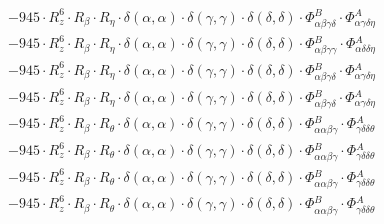 \documentclass{article}
\begin{document}
\begin{subequations}
\begin{gather}
\begin{array}{c}
 \\[0.2em] 		 - 945 \cdot R_{z}^{6} \cdot R_{\beta{}} \cdot R_{\eta{}} \cdot \delta{}\left(\alpha{}, \alpha{}\right) \cdot \delta{}\left(\gamma{}, \gamma{}\right) \cdot \delta{}\left(\delta{}, \delta{}\right) \cdot \Phi{}^{B}_{\alpha{}\beta{}\gamma{}\delta{}} \cdot \Phi{}^{A}_{\alpha{}\gamma{}\delta{}\eta{}} 
 \\[0.2em] 		 - 945 \cdot R_{z}^{6} \cdot R_{\beta{}} \cdot R_{\eta{}} \cdot \delta{}\left(\alpha{}, \alpha{}\right) \cdot \delta{}\left(\gamma{}, \gamma{}\right) \cdot \delta{}\left(\delta{}, \delta{}\right) \cdot \Phi{}^{B}_{\alpha{}\beta{}\gamma{}\gamma{}} \cdot \Phi{}^{A}_{\alpha{}\delta{}\delta{}\eta{}} 
 \\[0.2em] 		 - 945 \cdot R_{z}^{6} \cdot R_{\beta{}} \cdot R_{\eta{}} \cdot \delta{}\left(\alpha{}, \alpha{}\right) \cdot \delta{}\left(\gamma{}, \gamma{}\right) \cdot \delta{}\left(\delta{}, \delta{}\right) \cdot \Phi{}^{B}_{\alpha{}\beta{}\gamma{}\delta{}} \cdot \Phi{}^{A}_{\alpha{}\gamma{}\delta{}\eta{}} 
 \\[0.2em] 		 - 945 \cdot R_{z}^{6} \cdot R_{\beta{}} \cdot R_{\eta{}} \cdot \delta{}\left(\alpha{}, \alpha{}\right) \cdot \delta{}\left(\gamma{}, \gamma{}\right) \cdot \delta{}\left(\delta{}, \delta{}\right) \cdot \Phi{}^{B}_{\alpha{}\beta{}\gamma{}\delta{}} \cdot \Phi{}^{A}_{\alpha{}\gamma{}\delta{}\eta{}} 
 \\[0.2em] 		 - 945 \cdot R_{z}^{6} \cdot R_{\beta{}} \cdot R_{\theta{}} \cdot \delta{}\left(\alpha{}, \alpha{}\right) \cdot \delta{}\left(\gamma{}, \gamma{}\right) \cdot \delta{}\left(\delta{}, \delta{}\right) \cdot \Phi{}^{B}_{\alpha{}\alpha{}\beta{}\gamma{}} \cdot \Phi{}^{A}_{\gamma{}\delta{}\delta{}\theta{}} 
 \\[0.2em] 		 - 945 \cdot R_{z}^{6} \cdot R_{\beta{}} \cdot R_{\theta{}} \cdot \delta{}\left(\alpha{}, \alpha{}\right) \cdot \delta{}\left(\gamma{}, \gamma{}\right) \cdot \delta{}\left(\delta{}, \delta{}\right) \cdot \Phi{}^{B}_{\alpha{}\alpha{}\beta{}\gamma{}} \cdot \Phi{}^{A}_{\gamma{}\delta{}\delta{}\theta{}} 
 \\[0.2em] 		 - 945 \cdot R_{z}^{6} \cdot R_{\beta{}} \cdot R_{\theta{}} \cdot \delta{}\left(\alpha{}, \alpha{}\right) \cdot \delta{}\left(\gamma{}, \gamma{}\right) \cdot \delta{}\left(\delta{}, \delta{}\right) \cdot \Phi{}^{B}_{\alpha{}\alpha{}\beta{}\gamma{}} \cdot \Phi{}^{A}_{\gamma{}\delta{}\delta{}\theta{}} 
 \\[0.2em] 		 - 945 \cdot R_{z}^{6} \cdot R_{\beta{}} \cdot R_{\theta{}} \cdot \delta{}\left(\alpha{}, \alpha{}\right) \cdot \delta{}\left(\gamma{}, \gamma{}\right) \cdot \delta{}\left(\delta{}, \delta{}\right) \cdot \Phi{}^{B}_{\alpha{}\alpha{}\beta{}\gamma{}} \cdot \Phi{}^{A}_{\gamma{}\delta{}\delta{}\theta{}} 

\end{array}
\end{gather}
\end{subequations}
\end{document}
